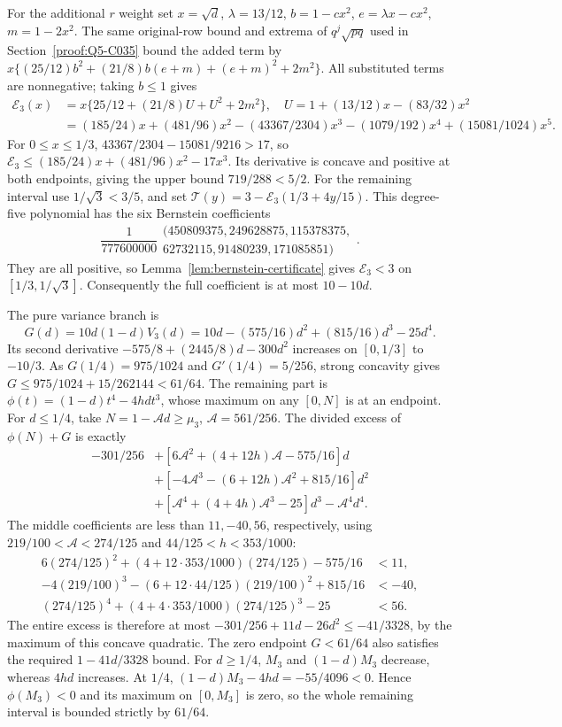For the additional $r$ weight set $x=\sqrt d$, $\lambda=13/12$,
$b=1-cx^2$, $e=\lambda x-cx^2$, $m=1-2x^2$.
The same original-row bound and extrema of $q^j\sqrt{pq}$ used in
Section~\ref{proof:Q5-C035} bound the added term by
$x\{(25/12)b^2+(21/8)b(e+m)+(e+m)^2+2m^2\}$.
All substituted terms are nonnegative; taking $b\le1$ gives
\[
\begin{aligned}
\mathcal E_3(x)&=x\{25/12+(21/8)U+U^2+2m^2\},
\quad U=1+(13/12)x-(83/32)x^2\\
&=(185/24)x+(481/96)x^2-(43367/2304)x^3
-(1079/192)x^4+(15081/1024)x^5.
\end{aligned}
\]
For $0\le x\le1/3$, $43367/2304-15081/9216>17$, so
$\mathcal E_3\le(185/24)x+(481/96)x^2-17x^3$.
Its derivative is concave and positive at both endpoints, giving
the upper bound $719/288<5/2$.
For the remaining interval use \(1/\sqrt3<3/5\), and set
\(\mathcal T(y)=3-\mathcal E_3(1/3+4y/15)\).
This degree-five polynomial has the six Bernstein coefficients
\[
 \frac1{777600000}\begin{gathered}
(450809375,249628875,115378375,\\
62732115,91480239,171085851)
\end{gathered}.
\]
They are all positive, so Lemma~\ref{lem:bernstein-certificate}
gives \(\mathcal E_3<3\) on \([1/3,1/\sqrt3]\).
Consequently the full coefficient is at most $10-10d$.

The pure variance branch is
\[
G(d)=10d(1-d)V_3(d)=10d-(575/16)d^2+(815/16)d^3-25d^4.
\]
Its second derivative $-575/8+(2445/8)d-300d^2$ increases on
$[0,1/3]$ to $-10/3$. As $G(1/4)=975/1024$ and $G'(1/4)=5/256$,
strong concavity gives $G\le975/1024+15/262144<61/64$.
The remaining part is $\phi(t)=(1-d)t^4-4hdt^3$, whose maximum on
any $[0,N]$ is at an endpoint. For $d\le1/4$, take
$N=1-\mathcal A d\ge\mu_3$, $\mathcal A=561/256$.
The divided excess of $\phi(N)+G$ is exactly
\begin{align*}
-301/256
&+[6\mathcal A^2+(4+12h)\mathcal A-575/16]d\\
&+[-4\mathcal A^3-(6+12h)\mathcal A^2+815/16]d^2\\
&+[\mathcal A^4+(4+4h)\mathcal A^3-25]d^3-\mathcal A^4d^4.
\end{align*}
The middle coefficients are less than $11,-40,56$, respectively, using
$219/100<\mathcal A<274/125$ and $44/125<h<353/1000$:
\[
\begin{aligned}
6(274/125)^2+(4+12\cdot353/1000)(274/125)-575/16&<11,\\
-4(219/100)^3-(6+12\cdot44/125)(219/100)^2+815/16&<-40,\\
(274/125)^4+(4+4\cdot353/1000)(274/125)^3-25&<56.
\end{aligned}
\]
The entire excess is therefore at most
$-301/256+11d-26d^2\le-41/3328$, by the maximum of this concave
quadratic. The zero endpoint $G<61/64$ also satisfies the required
$1-41d/3328$ bound. For $d\ge1/4$, $M_3$ and $(1-d)M_3$ decrease,
whereas $4hd$ increases. At $1/4$, $(1-d)M_3-4hd=-55/4096<0$.
Hence $\phi(M_3)<0$ and its maximum on $[0,M_3]$ is zero, so the
whole remaining interval is bounded strictly by $61/64$.

